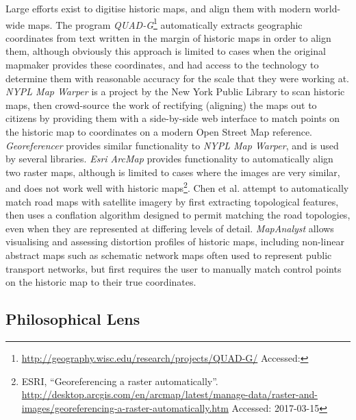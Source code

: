 {
Large efforts exist to digitise historic maps, and align them with
modern world-wide maps. The program \emph{QUAD-G}\footnote{\url{http://geography.wisc.edu/research/projects/QUAD-G/}
  Accessed: } automatically extracts geographic coordinates
from text written in the margin of historic maps in order to align them,
although obviously this approach is limited to cases when the original
mapmaker provides these coordinates, and had access to the technology to
determine them with reasonable accuracy for the scale that they were
working at. \emph{NYPL Map Warper} \cite{vershbow_nypl_2013, knutzen_unbinding_2013} is a project by the New York Public Library
to scan historic maps, then crowd-source the work of rectifying
(aligning) the maps out to citizens by providing them with a
side-by-side web interface to match points on the historic map to
coordinates on a modern Open Street Map reference.
\emph{Georeferencer} \cite{fleet_georeferencer_2012} provides similar
functionality to \emph{NYPL Map Warper}, and is used by several
libraries. \emph{Esri ArcMap} provides functionality to automatically
align two raster maps, although is limited to cases where the images are
very similar, and does not work well with historic maps\footnote{ESRI,
  ``Georeferencing a raster automatically''.
  \url{http://desktop.arcgis.com/en/arcmap/latest/manage-data/raster-and-images/georeferencing-a-raster-automatically.htm}
  Accessed: 2017-03-15}. Chen et al. \cite{chen_automatically_2008} attempt
to automatically match road maps with satellite imagery by first
extracting topological features, then uses a conflation algorithm
designed to permit matching the road topologies, even when they are
represented at differing levels of detail.
\emph{MapAnalyst} \cite{jenny_mapanalyst-digital_2006} allows
visualising and assessing distortion profiles of historic maps,
including non-linear abstract maps such as schematic network maps often
used to represent public transport networks, but first requires the
user to manually match control points on the historic map to their true
coordinates.
}

\subsection{Philosophical Lens}

